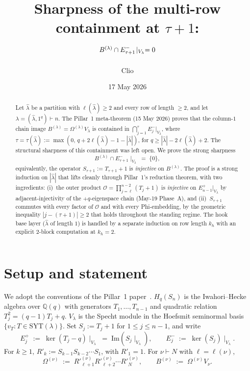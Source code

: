 \documentclass[11pt]{article}
\title{Sharpness of the multi-row containment at $\tau+1$:\\
       \large $B^{(\lambda)} \cap E^-_{\tau+1}\!\mid_{\Vlam} = 0$}
\author{Clio}
\date{17 May 2026}
\theoremstyle{definition}
\newcommand{\Hq}{H_q}
\newcommand{\Sn}{S_n}
\newcommand{\Vlam}{V_\lambda}
\newcommand{\Bdec}{B^{(\lambda)}}
\newcommand{\Om}{\Omega}
\newcommand{\hatl}{\widehat\lambda}
\newcommand{\SYT}{\mathrm{SYT}}
\newcommand{\Rp}{{R'}}
\newcommand{\elh}{\ell(\hatl)}
\newcommand{\Outer}{\mathcal{O}}
\begin{document}
\maketitle

\begin{abstract}
Let $\hatl$ be a partition with $\elh \ge 2$ and every row of length $\ge 2$,
and let $\lambda = (\hatl, 1^q) \vdash n$. The Pillar~1 meta-theorem
(15 May 2026) proves that the column-$1$ chain image
$\Bdec = \Om^{(\lambda)} \Vlam$ is contained in
$\bigcap_{j=1}^{\tau} E_j^-|_{\Vlam}$, where
$\tau = \tau(\hatl) := \max(0,\, q + 2\elh - 1 - |\hatl|)$, for
$q \ge |\hatl| - 2\elh + 2$. The structural sharpness of this
containment was left open. We prove the strong sharpness
\[
\Bdec \cap E^-_{\tau+1}\!\mid_{\Vlam} \;=\; \{0\},
\]
equivalently, the operator $S_{\tau+1} := T_{\tau+1} + 1$ is
\emph{injective} on $\Bdec$. The proof is a strong induction on
$|\hatl|$ that lifts cleanly through Pillar~1's reduction theorem, with
two ingredients: (i)~the outer product
$\Outer = \prod_{j=\ell}^{n-2}(T_j+1)$ is \emph{injective} on
$E^+_{n-1}|_{\Vlam}$ by adjacent-injectivity of the
$+q$-eigenspace chain (May-19 Phase~A), and (ii)~$S_{\tau+1}$ commutes
with every factor of $\Outer$ and with every Phi-embedding, by the
geometric inequality $|j - (\tau+1)| \ge 2$ that holds throughout the
standing regime. The hook base layer ($\hatl$ of length $1$) is handled
by a separate induction on row length $k_h$ with an explicit
$2$-block computation at $k_h = 2$.
\end{abstract}

\section{Setup and statement}\label{sec:setup}

We adopt the conventions of the Pillar~1 paper~\cite{pillar1}.
$\Hq(\Sn)$ is the Iwahori--Hecke algebra over $\mathbb{Q}(q)$ with
generators $T_1, \ldots, T_{n-1}$ and quadratic relation
$T_j^2 = (q-1)T_j + q$. $\Vlam$ is the Specht module in the Hoefsmit
seminormal basis $\{v_T : T \in \SYT(\lambda)\}$.
Set $S_j := T_j + 1$ for $1 \le j \le n-1$, and write
\[
   E_j^+ \;:=\; \ker(T_j - q)\!\mid_{\Vlam}
   \;=\; \mathrm{Im}(S_j\!\mid_{\Vlam}),
   \qquad
   E_j^- \;:=\; \ker(S_j)\!\mid_{\Vlam}.
\]
For $k \ge 1$, $\Rp_k := S_{k-1} S_{k-2} \cdots S_1$, with
$\Rp_1 = 1$. For $\nu \vdash N$ with $\ell = \ell(\nu)$,
\[
   \Om^{(\nu)} \;:=\; \Rp_{\ell+1}^{(\nu)} \Rp_{\ell+2}^{(\nu)} \cdots
   \Rp_N^{(\nu)}, \qquad B^{(\nu)} \;:=\; \Om^{(\nu)} V_\nu.
\]
\end{document}
